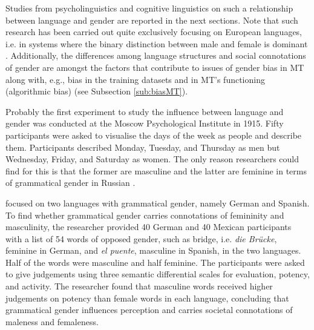 Studies from psycholinguistics and cognitive linguistics on such a relationship between language and gender are reported in the next sections. Note that such research has been carried out quite exclusively focusing on European languages, i.e. in systems where the binary distinction between male and female is dominant \citep[199]{deutscher2010through}. Additionally, the differences among language structures and social connotations of gender are amongst the factors that contribute to issues of gender bias in MT along with, e.g., bias in the training datasets and in MT's functioning (algorithmic bias) (see Subsection \ref{sub:biasMT}).

Probably the first experiment to study the influence between language and gender was conducted at the Moscow Psychological Institute in 1915. Fifty participants were asked to visualise the days of the week as people and describe them. Participants described Monday, Tuesday, and Thursday as men but Wednesday, Friday, and Saturday as women. The only reason researchers could find for this is that the former are masculine and the latter are feminine in terms of grammatical gender in Russian \citep[209]{deutscher2010through}.

\textcite{konishi1993semantics} focused on two languages with grammatical gender, namely German and Spanish. To find whether grammatical gender carries connotations of femininity and masculinity, the researcher provided 40 German and 40 Mexican participants with a list of 54 words of opposed gender, such as bridge, i.e. \textit{die Brücke}, feminine in German, and \textit{el puente}, masculine in Spanish, in the two languages. Half of the words were masculine and half feminine. The participants were asked to give judgements using three semantic differential scales for evaluation, potency, and activity. The researcher found that masculine words received higher judgements on potency than female words in each language, concluding that grammatical gender influences perception and carries societal connotations of maleness and femaleness.

